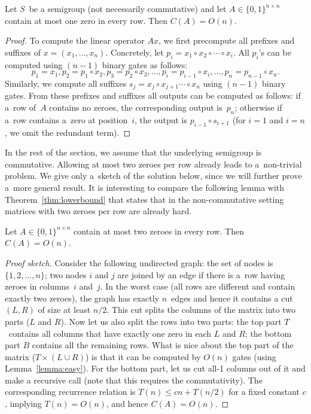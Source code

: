\documentclass[a4paper,UKenglish,cleveref, autoref]{lipics-v2019}
\begin{document}
\begin{lemma}\label{lemma:easy}
Let $S$~be a semigroup (not necessarily commutative) and let
$A \in \{0,1\}^{n \times n}$ contain at most
one zero in every row. Then
$C(A) = O(n)$.
\end{lemma}
\begin{proof}
To compute the linear operator $Ax$, we first
precompute all prefixes and suffixes of $x=(x_1, \dotsc, x_n)$.
Concretely, let $p_i=x_1 \circ x_2 \circ \dotsb \circ x_i$. All $p_i$'s can be computed
using $(n-1)$ binary gates as follows:
\[
p_1=x_1, p_2=p_1 \circ x_2, p_3=p_2 \circ x_3, \dotsc, p_i=p_{i-1} \circ x_i, \dotsc, p_n=p_{n-1}\circ x_n.
\]
Similarly, we compute all suffixes
$s_j=x_j \circ x_{j+1} \dotsb \circ x_n$ using
$(n-1)$ binary gates. From these prefixes and suffixes
all outputs can be
computed as follows: if a~row of~$A$ contains no zeroes,
the corresponding
output is~$p_n$; otherwise if a~row contains a~zero at position~$i$, the
output is $p_{i-1} \circ s_{i+1}$ (for $i=1$ and $i=n$, we omit the redundant
term).
\end{proof}

In the rest of the section, we assume that the
underlying semigroup is
commutative. Allowing at most two zeroes per row already leads to a~non-trivial
problem. We give only a~sketch of the solution below, since we will further
prove a~more general result. It is interesting to compare the following lemma
with Theorem~\ref{thm:lowerbound} that states that in the
non-commutative setting matrices with two zeroes per row are already hard.

\begin{lemma} \label{lem:at_most_2}
Let $A \in \{0,1\}^{n \times n}$ contain at most two zeroes in every row. Then
$C(A) = O(n)$.
\end{lemma}
\begin{proof}[Proof sketch]
Consider the following undirected graph: the set of nodes is $\{1,2,\dotsc,n\}$;
two nodes $i$ and $j$ are joined by an edge if there is a~row having zeroes in
columns~$i$ and~$j$. In the worst case (all rows are different and contain
exactly two zeroes), the graph has exactly $n$~edges and hence it contains a cut
$(L,R)$ of size at least $n/2$. This cut splits the columns of the matrix into
two parts ($L$ and $R$). Now let us also split the rows into two parts: the top
part $T$~contains all columns that have exactly one zero in each $L$ and $R$;
the bottom part $B$ contains all the remaining rows. What is nice about the top
part of the matrix ($T \times (L \cup R)$) is that it can be computed by $O(n)$
gates (using Lemma~\ref{lemma:easy}). For the bottom part, let us cut all-1
columns out of it and make a recursive call (note that this requires the
commutativity). The corresponding recurrence relation is $T(n) \le cn + T(n/2)$
for a fixed constant $c$, implying $T(n)=O(n)$, and hence $C(A) = O(n)$.
\end{proof}
\end{document}
